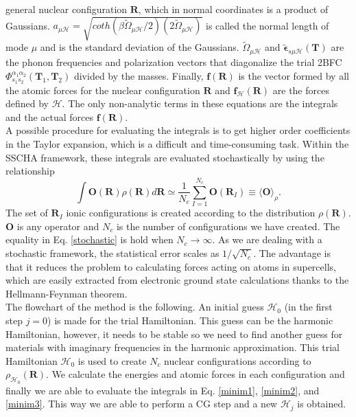 general nuclear configuration $\mathbf{R}$, which in normal coordinates is a product of Gaussians. $a_{\mu\mathcal{H}}=\sqrt{coth(\beta\tilde{\Omega}_{\mu\mathcal{H}}/2)(2\tilde{\Omega}_{\mu\mathcal{H}})}$ is called the normal 
length of mode $\mu$ and is the standard deviation of the Gaussians. $\tilde{\Omega}_{\mu\mathcal{H}}$ and $\tilde{\boldsymbol{\epsilon}}_{s\mu\mathcal{H}}(\mathbf{T})$ are the phonon frequencies and polarization vectors that 
diagonalize the trial 2BFC $\Phi_{s_{1}s_{2}}^{\alpha_{1}\alpha_{2}}(\mathbf{T}_{1},\mathbf{T}_{2})$ divided by the masses. Finally, $\mathbf{f}(\mathbf{R})$ is the vector formed by all the atomic forces for the nuclear 
configuration $\mathbf{R}$ and $\mathbf{f}_{\mathcal{H}}(\mathbf{R})$ are the forces defined by $\mathcal{H}$. The only non-analytic terms in these equations are the integrals and the actual forces $\mathbf{f}(\mathbf{R})$. \\

A possible procedure for evaluating the integrals is to get higher order coefficients in the Taylor expansion, which is a difficult and time-consuming task. Within the SSCHA framework, these integrals are evaluated 
stochastically by using the relationship
\begin{equation}
 \label{stochastic}
 \int{\mathbf{O}(\mathbf{R})\rho(\mathbf{R})d\mathbf{R}}\simeq\frac{1}{N_{c}}\sum_{I=1}^{N_{c}}\mathbf{O}(\mathbf{R}_{I})\equiv\langle\mathbf{O}\rangle_{\rho}.
\end{equation}
The set of $\mathbf{R}_{I}$ ionic configurations is created according to the distribution $\rho(\mathbf{R})$. $\mathbf{O}$ is any operator and $N_{c}$ is the number of configurations we have created. The equality 
in Eq. \ref{stochastic} is hold when $N_{c}\rightarrow\infty$. As we are dealing with a stochastic framework, the statistical error scales as $1/\sqrt{N_{c}}$. The advantage is that it reduces the problem to 
calculating forces acting on atoms in supercells, which are easily extracted from electronic ground state calculations thanks to the Hellmann-Feynman theorem. \\

The flowchart of the method is the following. An initial guess $\mathcal{H}_{0}$ (in the first step $j=0$) is made for the trial Hamiltonian. This guess can be the harmonic Hamiltonian, however, it needs to be stable
so we need to find another guess for materials with imaginary frequencies in the harmonic approximation. This trial Hamiltonian $\mathcal{H}_{0}$ is used to create $N_{c}$ nuclear configurations according to 
$\rho_{\mathcal{H}_{0}}(\mathbf{R})$. We calculate the energies and atomic forces in each configuration and finally we are able to evaluate the integrals in Eq. \ref{minim1}, \ref{minim2}, and \ref{minim3}. This way 
we are able to perform a CG step and a new $\mathcal{H}_{j}$ is obtained. \\

